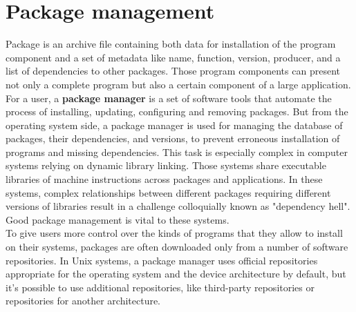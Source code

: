 \section{Package management} \label{sec:pm}
Package is an archive file containing both data for installation of the program component and a set of metadata like name, function, version, producer, and a list of dependencies to other packages. 
Those program components can present not only a complete program but also a certain component of a large application. %
For a user, a \textbf{package manager} is a set of software tools that automate the process of installing, updating, configuring and removing packages.
But from the operating system side, a package manager is used for managing the database of packages, their dependencies, and versions, to prevent erroneous installation of programs and missing dependencies.
This task is especially complex in computer systems relying on dynamic library linking. 
Those systems share executable libraries of machine instructions across packages and applications. 
In these systems, complex relationships between different packages requiring different versions of libraries result in a challenge colloquially known as "dependency hell".
Good package management is vital to these systems.\\
To give users more control over the kinds of programs that they allow to install on their systems, packages are often downloaded only from a number of software repositories.
In Unix systems, a package manager uses official repositories appropriate for the operating system and the device architecture by default, but it's possible to use additional repositories, like third-party repositories or repositories for another architecture.\\
